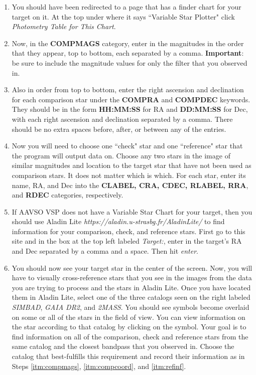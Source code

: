 \documentclass[11pt]{report}
\begin{document}
\begin{enumerate}
\item You should have been redirected to a page that has a finder chart for your target on it. At the top under where it says ``Variable Star Plotter" click \emph{Photometry Table for This Chart}.
\item Now, in the {\bf COMPMAGS} category, enter in the magnitudes in the order that they appear, top to bottom, each separated by a comma. \textbf{Important}: be sure to include the magnitude values for only the filter that you observed in. \label{itm:compmags}
\item Also in order from top to bottom, enter the right ascension and declination for each comparison star under the {\bf COMPRA} and {\bf COMPDEC} keywords. They should be in the form {\bf HH:MM:SS} for RA and {\bf DD:MM:SS} for Dec, with each right ascension and declination separated by a comma. There should be no extra spaces before, after, or between any of the entries. \label{itm:compcoord}
\item Now you will need to choose one ``check" star and one ``reference" star that the program will output data on. Choose any two stars in the image of similar magnitudes and location to the target star that have not been used as comparison stars. It does not matter which is which. For each star, enter its name, RA, and Dec into the {\bf CLABEL, CRA, CDEC, RLABEL, RRA}, and {\bf RDEC} categories, respectively. \label{itm:refinf}
\item If AAVSO VSP does not have a Variable Star Chart for your target, then you should use Aladin Lite \emph{https://aladin.u-strasbg.fr/AladinLite/} to find information for your comparison, check, and reference stars. First go to this site and in the box at the top left labeled \emph{Target:}, enter in the target's RA and Dec separated by a comma and a space. Then hit \emph{enter}. \label{itm:novsp}
\item You should now see your target star in the center of the screen. Now, you will have to visually cross-reference stars that you see in the images from the data you are trying to process and the stars in Aladin Lite. Once you have located them in Aladin Lite, select one of the three catalogs seen on the right labeled \emph{SIMBAD}, \emph{GAIA DR2}, and \emph{2MASS}. You should see symbols become overlaid on some or all of the stars in the field of view. You can view information on the star according to that catalog by clicking on the symbol. Your goal is to find information on all of the comparison, check and reference stars from the same catalog and the closest bandpass that you observed in. Choose the catalog that best-fulfills this requirement and record their information as in Steps \ref{itm:compmags}, \ref{itm:compcoord}, and \ref{itm:refinf}.

\end{enumerate}
\end{document}
